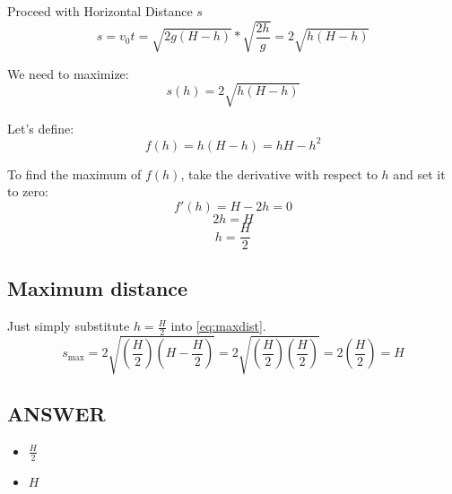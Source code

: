 \bigbreak Proceed with Horizontal Distance \( s \)
  \begin{equation}
    \label{eq:maxdist}
    s = v_0 t = \sqrt{2 g (H - h)} * \sqrt{\frac{2 h}{g}} = 2 \sqrt{h (H - h)}
  \end{equation}

We need to maximize:
\[
s(h) = 2 \sqrt{h (H - h)}
\]

Let's define:
\[
f(h) = h (H - h) = h H - h^2
\]

To find the maximum of \( f(h) \), take the derivative with respect to \( h \) and set it to zero:
$$ f'(h) = H - 2 h = 0 $$
$$ 2 h = H $$
$$ \boxed{h = \frac{H}{2}} $$

\subsection*{Maximum distance}
Just simply substitute $h = \frac{H}{2}$ into \ref{eq:maxdist}.
\[
s_{\text{max}} = 2 \sqrt{\left( \frac{H}{2} \right) \left( H - \frac{H}{2} \right)} = 2 \sqrt{\left( \frac{H}{2} \right) \left( \frac{H}{2} \right)} = 2 \left( \frac{H}{2} \right) = \boxed{H}
\]

\vfill \subsection*{ANSWER}
\begin{itemize}
    \item $\frac{H}{2}$
    \item $H$
\end{itemize}